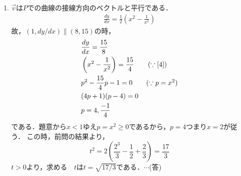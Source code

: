 \documentclass[a4j]{jarticle}
\begin{document}
\begin{multicols}{2}
\begin{enumerate}[(1)]
     \item $\vec{v}$は$P$での曲線の接線方向のベクトルと平行である．
          \begin{align}
          \frac{dy}{dx}=\frac{1}{2}\left(x^2-\frac{1}{x^2}\right)\label{4}
          \end{align}
     故，$(1,dy/dx)\parallel(8,15)$の時，
          \begin{align*}
          &\frac{dy}{dx}=\frac{15}{8} \\
          &\left(x^2-\frac{1}{x^2}\right)=\frac{15}{4}\tag{$\because\eqref{4}$} \\
          &p^2-\frac{15}{4}p-1=0\tag{$\because p=x^2$} \\
          &(4p+1)(p-4)=0 \\
          &p=4,\frac{-1}{4}
          \end{align*}
     である．題意から$x<1$ゆえ$p=x^2\ge0$であるから，$p=4$つまり$x=2$が従う．
     この時，前問の結果より，
          \[t^2=2\left(\frac{2^3}{3}-\frac{1}{2}+\frac{2}{3}\right)=\frac{17}{3}\]
     $t>0$より，求める　$t$は$t=\sqrt{17/3}$である．$\cdots$(答)
     \end{enumerate}
           
\newpage
\end{multicols}
\end{document}
